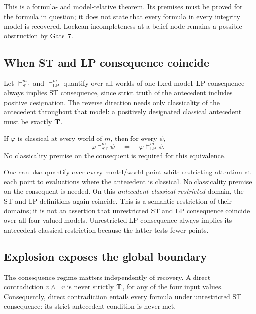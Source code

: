 This is a formula- and model-relative theorem. Its premises must be proved for the
formula in question; it does not state that every formula in every integrity model
is recovered. Lockean incompleteness at a belief node remains a possible obstruction
by Gate~7.

\subsection{When ST and LP consequence coincide}

Let \(\models^{m}_{\mathrm{ST}}\) and \(\models^{m}_{\mathrm{LP}}\) quantify over all
worlds of one fixed model. LP consequence always implies ST consequence, since
strict truth of the antecedent includes positive designation. The reverse direction
needs only classicality of the antecedent throughout that model: a positively
designated classical antecedent must be exactly \(\mathbf{T}\).

\begin{theorem}
\label{thm:gate9-model-consequence-collapse}
If \(\varphi\) is classical at every world of \(m\), then for every \(\psi\),
\[
\boxed{
\varphi\models^{m}_{\mathrm{ST}}\psi
\quad\Longleftrightarrow\quad
\varphi\models^{m}_{\mathrm{LP}}\psi.
}
\]
No classicality premise on the consequent is required for this equivalence.
\statusverified
\end{theorem}

One can also quantify over every model/world point while restricting attention at
each point to evaluations where the antecedent is classical. No classicality premise
on the consequent is needed. On this \emph{antecedent-classical-restricted} domain,
the ST and LP definitions again coincide. This is a semantic restriction of their
domains; it is not an assertion that unrestricted ST and LP consequence coincide over
all four-valued models. Unrestricted LP consequence always implies its
antecedent-classical restriction because the latter tests fewer points.

\subsection{Explosion exposes the global boundary}

The consequence regime matters independently of recovery. A direct contradiction
\(v\land\neg v\) is never strictly \(\mathbf{T}\), for any of the four input values.
Consequently, direct contradiction entails every formula under unrestricted ST
consequence: its strict antecedent condition is never met.

